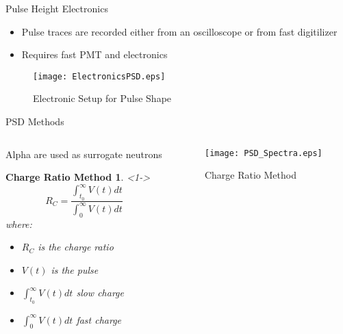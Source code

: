 \begin{frame}{Pulse Height Electronics}
	\begin{itemize}
		\small
		\item Pulse traces are recorded either from an oscilloscope or from fast digitilizer
		\item Requires fast PMT and electronics
	\end{itemize}
	\begin{figure}
		\centering
		\texttt{[image: ElectronicsPSD.eps]}
		\caption{Electronic Setup for Pulse Shape}
		\label{fig:ElectronicsPSD}
	\end{figure}
\end{frame}
\begin{frame}{PSD Methods}
\begin{columns}[onlytextwidth]
\begin{column}{0.45\textwidth}
	Alpha are used as surrogate neutrons
	\newtheorem{thm9}{Charge Ratio Method}
	\begin{thm9}<1->
		$$ R_C = \frac{\int_{t_0}^{\infty}{V(t)dt}}{\int_{0}^{\infty}{V(t)dt}} $$
	where:
	\begin{itemize}
		\tiny
		\item $R_C$ is the charge ratio
		\item $V(t)$ is the pulse
		\item $\int_{t_0}^{\infty}{V(t)dt}$ slow charge
		\item $\int_{0}^{\infty}{V(t)dt}$ fast charge
	\end{itemize}
	\end{thm9}
\end{column}
\begin{column}{0.45\textwidth}
	\begin{figure}
		\centering
		\texttt{[image: PSD\_Spectra.eps]}
		\caption{Charge Ratio Method}
		\label{fig:PSD_ChargeRatio}
	\end{figure}
\end{column}
\end{columns}
\end{frame}
